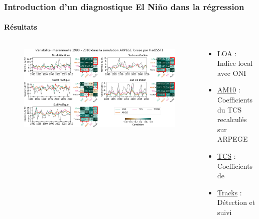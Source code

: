 \documentclass[aspectratio=169, usepdftitle=false, xcolor={dvipsnames}, 9pt,table]{beamer}
\begin{document}
\begin{frame}[t]
    \frametitle{Introduction d'un diagnostique El Niño dans la régression}
    \framesubtitle{Résultats}
    \vspace{-1em}
    \begin{columns}
        \begin{column}{0.8\textwidth}
            \begin{figure}
                \centering
                \includegraphics[width=\textwidth]{Figures/apport_ONI.png}
            \end{figure}
        \end{column}
        \begin{column}{0.2\textwidth}
            \scriptsize
            \begin{examples}
                \setlength{\leftmargini}{2.5ex}
                \begin{itemize}
                    \item \underline{LOA} :\\Indice \alert{local} avec ONI
                    \item \underline{AM10} :\\Coefficients du TCS recalculés sur ARPEGE
                    \item \underline{TCS} :\\Coefficients de \cite{tippett_poisson_2011}
                    \item \underline{Tracks} :\\Détection et suivi
                \end{itemize}
            \end{examples}

\end{column}
\end{columns}
\end{frame}
\end{document}
